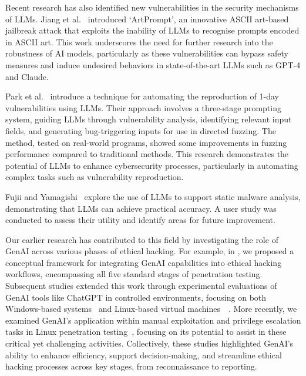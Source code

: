 Recent research has also identified new vulnerabilities in the security  mechanisms of  LLMs. Jiang et al.\ \cite{jiang2024artprompt} introduced `ArtPrompt', an innovative ASCII
art-based jailbreak attack that exploits the inability of LLMs to recognise prompts encoded in
ASCII art. This work underscores the need for further research into the robustness of AI models,
particularly as these vulnerabilities can bypass safety measures and induce undesired behaviors in
state-of-the-art LLMs such as GPT-4 and Claude.

Park et al.\ \cite{SecAI24_SystematicBugReproductionWithLargeLanguageModel} introduce a technique for automating the reproduction of 1-day vulnerabilities using LLMs. Their approach involves a three-stage prompting system, guiding LLMs through vulnerability analysis, identifying relevant input fields, and generating bug-triggering inputs for use in directed fuzzing. The method, tested on real-world programs, showed some improvements in fuzzing performance compared to traditional methods. This research demonstrates the potential of LLMs to enhance cybersecurity processes, particularly in automating complex tasks such as vulnerability reproduction.


Fujii and Yamagishi\ \cite{SecAI24_FeasibilityStudyforSupportingStaticMalwareAnalysisUsingLLM_2024} explore the use of LLMs  to support static malware analysis, demonstrating that LLMs can achieve practical accuracy. A user study was conducted to assess their utility and identify areas for future improvement.


Our earlier research has  contributed to this field by investigating the role of GenAI across various phases of ethical hacking. For example, in \cite{STM24_UnleashingAIinEthicalHacking}, we proposed a conceptual framework for integrating GenAI capabilities into ethical hacking workflows, encompassing all five standard stages of penetration testing. Subsequent studies extended this work through experimental evaluations of GenAI tools like ChatGPT in controlled environments, focusing on both Windows-based systems~\cite{TechReportUnAIInEH_HC_2024} and Linux-based virtual machines~\cite{TechReport_AI-EnhancedEthicalHackingALinux-FocusedExperiment_HC_2024}~\cite{Paper_AdvancingEthicalHackingWithAI:ALinux-BasedExperimentalStudy_HC_2024}.  More recently, we examined GenAI's application within manual exploitation and privilege escalation tasks in Linux penetration testing~\cite{TechReport_APracticalExaminationOfManualExploitationAndPrivilegeEscalationInLinuxEnvironments_HC_2024}, focusing on its potential to assist in these critical yet challenging activities. Collectively, these studies highlighted GenAI's ability to enhance efficiency, support decision-making, and streamline ethical hacking processes across key stages, from reconnaissance to reporting.

